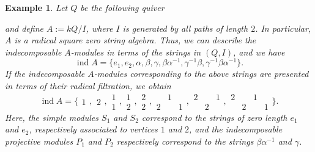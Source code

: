 \documentclass{amsart}
\theoremstyle{thmstyle}
\theoremstyle{exstyle}
\newtheorem{example}[thm]{Example}
\theoremstyle{defstyle}
\theoremstyle{remstyle}
\theoremstyle{remstyle}
\DeclareMathOperator*{\ind}{ind}
\begin{document}
\begin{example}\label{Example: Non-trivial brick-splitting torsion pairs}
Let $Q$ be the following quiver
\begin{center}
\end{center}
and define $A:=kQ/I$, where $I$ is generated by all paths of length $2$.
In particular, $A$ is a radical square zero string algebra. Thus, we can describe the indecomposable $A$-modules in terms of the strings in $(Q,I)$, and we have
$$\ind A=\{e_1, e_2, \alpha, \beta, \gamma, \beta \alpha^{-1}, \gamma^{-1}\beta, \gamma^{-1}\beta\alpha^{-1} \}.$$
If the indecomposable $A$-modules corresponding to the above strings are presented in terms of their radical filtration, we obtain
$$\ind A=\{{\begin{smallmatrix} 1\end{smallmatrix}}, {\begin{smallmatrix} 2\end{smallmatrix}}, {\begin{smallmatrix} 1\\1\end{smallmatrix}}, {\begin{smallmatrix} 1\\2\end{smallmatrix}}, {\begin{smallmatrix} 2\\2\end{smallmatrix}}, {\begin{smallmatrix} & 1& \\2& &1\end{smallmatrix}}, {\begin{smallmatrix} 2& &1 \\ &2& \end{smallmatrix}}, {\begin{smallmatrix} 2& &1& \\ &2& &1 \end{smallmatrix}} \}.
$$
Here, the simple modules $S_1$ and $S_2$ correspond to the strings of zero length  $e_1$ and $e_2$, respectively associated to vertices $1$ and $2$, and the indecomposable projective modules $P_1$ and $P_2$ respectively correspond to the strings $\beta\alpha^{-1}$ and $\gamma$.


\end{example}
\end{document}
